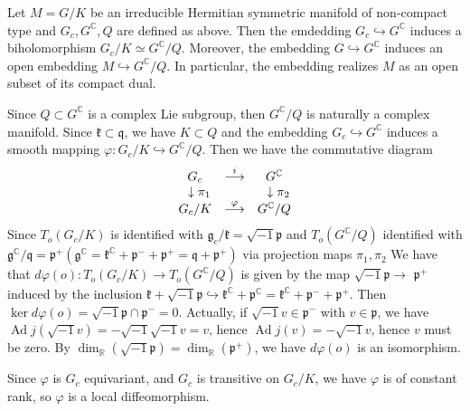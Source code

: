 \begin{theorem}
	Let $M=G / K$ be an irreducible Hermitian symmetric manifold
	of non-compact type and $G_{c}, G^{\mathbb{C}}, Q$ are
	defined as above. Then the emdedding $G_{c} \hookrightarrow
	G^{\mathbb{C}}$ induces a biholomorphism $G_{c} / K \simeq
	G^{\mathbb{C}} / Q .$ Moreover, the embedding $G
	\hookrightarrow G^{\mathbb{C}}$ induces an open embedding $M
	\hookrightarrow G^{\mathbb{C}} / Q .$ In particular, the
	embedding realizes $M$ as an open subset of its compact dual.
\end{theorem}
\bproof
Since $Q \subset G^{\mathbb{C}}$ is a complex Lie subgroup, then
$G^{\mathbb{C}} / Q$ is naturally a complex manifold. Since
$\mathfrak{k} \subset \mathfrak{q}$, we have $K \subset Q$ and
the embedding $G_{c} \hookrightarrow G^{\mathbb{C}}$ induces a
smooth mapping $\varphi: G_{c} / K \hookrightarrow G^{\mathbb{C}}
/ Q$. Then we have the commutative
diagram
\[
\begin{matrix}
	G_c&\stackrel{i}{\longrightarrow}&G^{{\mathbb C}}\\
	\ \ \downarrow \pi_1& &\ \ \downarrow \pi_2\\
	G_c/K&\stackrel{\varphi}{\longrightarrow}&G^{{\mathbb C}}/Q
\end{matrix}
\]
Since $T_{o}\left(G_{c} / K\right)$ is identified with
$\mathfrak{g}_{c} / \mathfrak{k}=\sqrt{-1} \mathfrak{p}$ and
$T_{o}\left(G^{\mathbb{C}} / Q\right)$ identified with
$\mathfrak{g}^{\mathbb{C}} /
\mathfrak{q}=\mathfrak{p}^{+}\left(\mathfrak{g}^{\mathbb{C}}
=\mathfrak{k}^{\mathbb{C}}+\mathfrak{p}^{-}+\mathfrak{p}^{+}
=\mathfrak{q}+\mathfrak{p}^{+}\right)$ via projection maps $\pi_{1},\pi_{2}$
We have that $d \varphi(o): T_{o}\left(G_{c} / K\right)
\rightarrow T_{o}\left(G^{\mathbb{C}} / Q\right)$ is given by the
map $\sqrt{-1} \mathfrak{p} \rightarrow$
$\mathfrak{p}^{+}$ induced by the inclusion
$\mathfrak{k}+\sqrt{-1} \mathfrak{p} \hookrightarrow
\mathfrak{k}^{\mathbb{C}}+\mathfrak{p}^{\mathbb{C}}=
\mathfrak{k}^{\mathbb{C}}+\mathfrak{p}^{-}+\mathfrak{p}^{+}$. Then
$\operatorname{ker} d \varphi(o)=\sqrt{-1} \mathfrak{p} \cap
\mathfrak{p}^{-}=0$. Actually, if $\sqrt{-1} v \in
\mathfrak{p}^{-}$ with $v \in \mathfrak{p}$, we have
$\operatorname{Ad} j(\sqrt{-1} v)=-\sqrt{-1} \sqrt{-1} v=v$,
hence $\operatorname{Ad} j(v)=-\sqrt{-1} v$, hence $v$ must
be zero. By $\operatorname{dim}_{\mathbb{R}}(\sqrt{-1}
\mathfrak{p})=\operatorname{dim}_{\mathbb{R}}\left(\mathfrak{p}^{+}
\right)$, we have $d \varphi(o)$ is an isomorphism.

Since $\varphi$ is $G_{c}$ equivariant, and $G_{c}$ is transitive
on $G_{c} / K$, we have $\varphi$ is of
constant rank, so $\varphi$ is a local diffeomorphism. 

